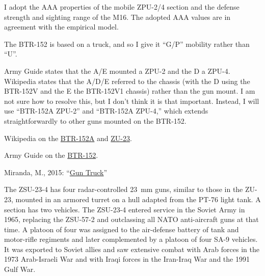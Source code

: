 \begin{withcounters}
{        I adopt the AAA properties of the mobile ZPU-2/4 section and the defense strength and sighting range of the M16.
        The adopted AAA values are in agreement with the empirical model.

        The BTR-152 is based on a truck, and so I give it “G/P” mobility rather than “U”.

        Army Guide states that the A/E mounted a ZPU-2 and the D a ZPU-4. Wikipedia states that the A/D/E referred to the chassis (with the D using the BTR-152V and the E the BTR-152V1 chassis) rather than the gun mount. I am not sure how to resolve this, but I don't think it is that important. Instead, I will use “BTR-152A ZPU-2” and “BTR-152A ZPU-4,” which extends straightforwardly to other guns mounted on the BTR-152.

        \begin{notesources}
            \item Wikipedia on the \href{https://en.wikipedia.org/wiki/BTR-152\#Soviet_Union}{BTR-152A} and \href{https://en.wikipedia.org/wiki/ZU-23-2}{ZU-23}.
            \item Army Guide on the \href{https://www.army-guide.com/eng/product1120.html}{BTR-152}.
            \item Miranda, M., 2015: “\href{https://thesovietarmourblog.blogspot.com/2015/12/}{Gun Truck}”
        \end{notesources}
    }


    The ZSU-23-4 has four radar-controlled 23~mm guns, similar to those in the ZU-23, mounted in an armored turret on a hull adapted from the PT-76 light tank.
    A section has two vehicles.
    The ZSU-23-4 entered service in the Soviet Army in 1965, replacing the ZSU-57-2 and outclassing all NATO anti-aircraft guns at that time. A platoon of four was assigned to the air-defense battery of tank and motor-rifle regiments and later complemented by a platoon of four SA-9 vehicles. It was exported to Soviet allies and saw extensive combat with Arab forces in the 1973 Arab-Israeli War and with Iraqi forces in the Iran-Iraq War and the 1991 Gulf War.%
\end{withcounters}
